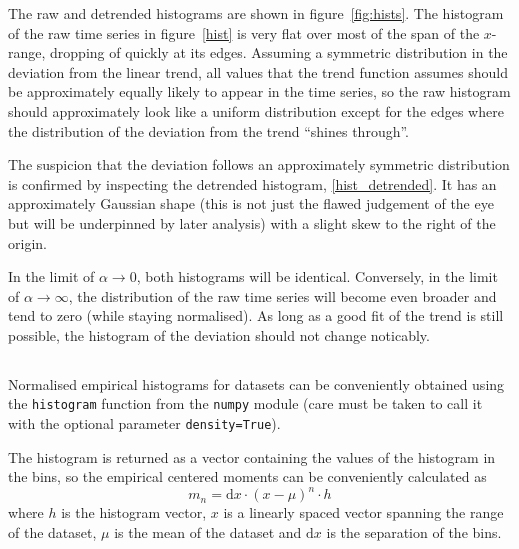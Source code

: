 \documentclass[a4paper,DIV=12,english]{scrartcl}
\begin{document}
The raw and detrended histograms are shown in figure~\ref{fig:hists}. The histogram of the raw time series in figure~\ref{hist} is very flat over most of the span of the $x$-range, dropping of quickly at its edges. Assuming a symmetric distribution in the deviation from the linear trend, all values that the trend function assumes should be approximately equally likely to appear in the time series, so the raw histogram should approximately look like a uniform distribution except for the edges where the distribution of the deviation from the trend \enquote{shines through}.

The suspicion that the deviation follows an approximately symmetric distribution is confirmed by inspecting the detrended histogram, \ref{hist_detrended}. It has an approximately Gaussian shape (this is not just the flawed judgement of the eye but will be underpinned by later analysis) with a slight skew to the right of the origin.

In the limit of $\alpha\longrightarrow 0$, both histograms will be identical. Conversely, in the limit of $\alpha\longrightarrow\infty$, the distribution of the raw time series will become even broader and tend to zero (while staying normalised). As long as a good fit of the trend is still possible, the histogram of the deviation should not change noticably.

\subsection{}
Normalised empirical histograms for datasets can be conveniently obtained using the \texttt{histogram} function from the \texttt{numpy} module (care must be taken to call it with the optional parameter \texttt{density=True}).

The histogram is returned as a vector containing the values of the histogram in the bins, so the empirical centered moments can be conveniently calculated as
\begin{equation}
    m_n = \text{d}x \cdot (x - \mu)^n \cdot h
\end{equation}
where $h$ is the histogram vector, $x$ is a linearly spaced vector spanning the range of the dataset, $\mu$ is the mean of the dataset and $\text{d}x$ is the separation of the bins.
\end{document}
